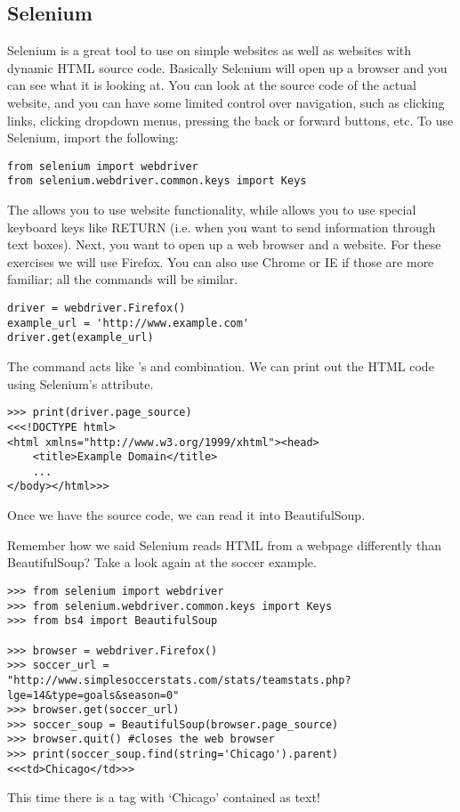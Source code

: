 \subsection*{Selenium}

Selenium is a great tool to use on simple websites as well as websites with dynamic HTML source code.
Basically Selenium will open up a browser and you can see what it is looking at.
You can look at the source code of the actual website, and you can have some limited control over navigation, such as clicking links, clicking dropdown menus, pressing the back or forward buttons, etc.
To use Selenium, import the following:
\begin{lstlisting}
from selenium import webdriver
from selenium.webdriver.common.keys import Keys
\end{lstlisting}
The  allows you to use website functionality, while  allows you to use special keyboard keys like RETURN (i.e. when you want to send information through text boxes).
Next, you want to open up a web browser and a website.
For these exercises we will use Firefox.
You can also use Chrome or IE if those are more familiar; all the commands will be similar.
\begin{lstlisting}
driver = webdriver.Firefox()
example_url = 'http://www.example.com'
driver.get(example_url)
\end{lstlisting}
The  command acts like 's  and  combination.
We can print out the HTML code using Selenium's  attribute.
\begin{lstlisting}
>>> print(driver.page_source)
<<<!DOCTYPE html>
<html xmlns="http://www.w3.org/1999/xhtml"><head>
    <title>Example Domain</title>
    ...
</body></html>>>
\end{lstlisting}
Once we have the source code, we can read it into BeautifulSoup.

Remember how we said Selenium reads HTML from a webpage differently than BeautifulSoup?
Take a look again at the soccer example.
\begin{lstlisting}
>>> from selenium import webdriver
>>> from selenium.webdriver.common.keys import Keys
>>> from bs4 import BeautifulSoup

>>> browser = webdriver.Firefox()
>>> soccer_url = "http://www.simplesoccerstats.com/stats/teamstats.php?lge=14&type=goals&season=0"
>>> browser.get(soccer_url)
>>> soccer_soup = BeautifulSoup(browser.page_source)
>>> browser.quit() #closes the web browser
>>> print(soccer_soup.find(string='Chicago').parent)
<<<td>Chicago</td>>>
\end{lstlisting}
This time there is a tag with `Chicago' contained as text!

